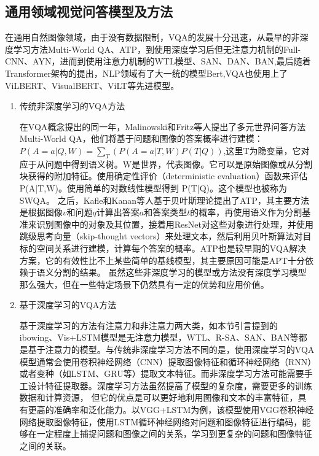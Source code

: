 \subsection{通用领域视觉问答模型及方法}
在通用自然图像领域，由于没有数据限制，VQA的发展十分迅速，从最早的非深度学习方法Multi-World QA、ATP，到使用深度学习后但无注意力机制的Full-CNN\cite{ma2016learning}、AYN\cite{malinowski2017ask}，进而到使用注意力机制的WTL模型\cite{zitnick2014edge}、SAN、DAN\cite{nam2017dual}、BAN,最后随着Transformer架构的提出，NLP领域有了大一统的模型Bert\cite{devlin2018bert},VQA也使用上了ViLBERT\cite{lu2019vilbert}、VisualBERT\cite{li2019visualbert}、ViLT\cite{kim2021vilt}等先进模型。
\begin{enumerate}[topsep = 0 pt, itemsep= 0 pt, parsep=0pt, partopsep=0pt, leftmargin=0pt, itemindent=44pt, labelsep=6pt, listparindent=22pt, label=(\arabic*)]
    \item 传统非深度学习的VQA方法 
    
    在VQA概念提出的同一年，Malinowski和Fritz等人\cite{malinowski2014multi}提出了多元世界问答方法Multi-World QA，他们将基于问题和图像的答案概率进行建模：$P(A = a|Q,W) = \sum_T(P(A=a|T,W)P(T|Q))$,这里T为隐变量，它对应于从问题中得到语义树。W是世界，代表图像。它可以是原始图像或从分割块获得的附加特征。使用确定性评价（deterministic evaluation）函数来评估 P(A|T,W)。使用简单的对数线性模型得到 P(T|Q)。这个模型也被称为SWQA。
    之后，Kafle和Kanan等人\cite{kafle2016answer}基于贝叶斯理论提出了ATP，其主要方法是根据图像$v$和问题$q$计算出答案$a$和答案类型$t$的概率，再使用语义作为分割基准来识别图像中的对象及其位置，接着用ResNet对这些对象进行处理，并使用跳级思考向量（skip-thought vectors）来处理文本，然后利用贝叶斯算法对目标的空间关系进行建模，计算每个答案的概率。ATP也是较早期的VQA解决方案，它的有效性比不上某些简单的基线模型，其主要原因可能是APT十分依赖于语义分割的结果。
    虽然这些非深度学习的模型或方法没有深度学习模型那么强大，但在一些特定场景下仍然具有一定的优势和应用价值。
    \item 基于深度学习的VQA方法

    基于深度学习的方法有注意力和非注意力两大类，如本节引言提到的ibowing、Vis+LSTM模型是无注意力模型，WTL、R-SA、SAN、BAN等都是基于注意力的模型。与传统非深度学习方法不同的是，使用深度学习的VQA模型通常会使用卷积神经网络（CNN）提取图像特征和循环神经网络（RNN）或者变种（如LSTM、GRU等）提取文本特征。而非深度学习方法可能需要手工设计特征提取器。深度学习方法虽然提高了模型的复杂度，需要更多的训练数据和计算资源，
    但它的优点是可以更好地利用图像和文本的丰富特征，具有更高的准确率和泛化能力。以VGG+LSTM为例，该模型使用VGG卷积神经网络提取图像特征，使用LSTM循环神经网络对问题和图像特征进行编码，能够在一定程度上捕捉问题和图像之间的关系，学习到更复杂的问题和图像特征之间的关联。
\end{enumerate}

